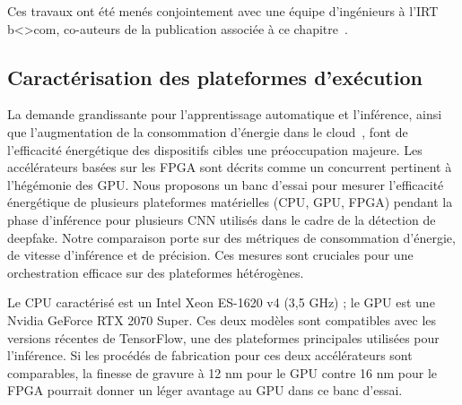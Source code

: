 Ces travaux ont été menés conjointement avec une équipe d'ingénieurs à l'IRT b{\textless\textgreater}com, co-auteurs de la publication associée à ce chapitre~\cite{herofake}.

\subsection{Caractérisation des plateformes d'exécution}

\begin{table}[!ht]
    \caption{Caractérisation des plateformes d'exécution.}
    \begin{center}
    \end{center}
    \label{table:herofake-platforms}
\end{table}

La demande grandissante pour l'apprentissage automatique et l'inférence, ainsi que l'augmentation de la consommation d'énergie dans le cloud~\cite{masanetRecalibratingGlobalData2020}, font de l'efficacité énergétique des dispositifs cibles une préoccupation majeure. Les accélérateurs basées sur les \gls{FPGA} sont décrits comme un concurrent pertinent à l'hégémonie des \gls{GPU}. Nous proposons un banc d'essai pour mesurer l'efficacité énergétique de plusieurs plateformes matérielles (\gls{CPU}, \gls{GPU}, \gls{FPGA}) pendant la phase d'inférence pour plusieurs \gls{CNN} utilisés dans le cadre de la détection de deepfake. Notre comparaison porte sur des métriques de consommation d'énergie, de vitesse d'inférence et de précision. Ces mesures sont cruciales pour une orchestration efficace sur des plateformes hétérogènes.

Le \gls{CPU} caractérisé est un Intel Xeon ES-1620 v4 (3,5 GHz) ; le \gls{GPU} est une Nvidia GeForce RTX 2070 Super. Ces deux modèles sont compatibles avec les versions récentes de TensorFlow, une des plateformes principales utilisées pour l'inférence. Si les procédés de fabrication pour ces deux accélérateurs sont comparables, la finesse de gravure à 12 nm pour le \gls{GPU} contre 16 nm pour le \gls{FPGA} pourrait donner un léger avantage au \gls{GPU} dans ce banc d'essai.

